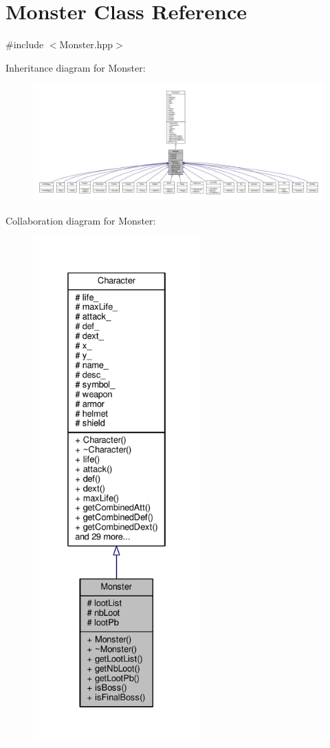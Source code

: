 \hypertarget{class_monster}{\section{Monster Class Reference}
\label{class_monster}
}


{\ttfamily \#include $<$Monster.\-hpp$>$}



Inheritance diagram for Monster\-:
\nopagebreak
\begin{figure}[H]
\begin{center}
\leavevmode
\includegraphics[width=350pt]{class_monster__inherit__graph}
\end{center}
\end{figure}


Collaboration diagram for Monster\-:
\nopagebreak
\begin{figure}[H]
\begin{center}
\leavevmode
\includegraphics[height=550pt]{class_monster__coll__graph}
\end{center}
\end{figure}
